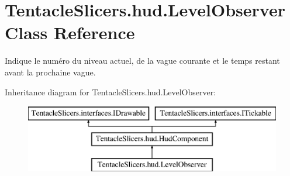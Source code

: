 \hypertarget{class_tentacle_slicers_1_1hud_1_1_level_observer}{}\section{Tentacle\+Slicers.\+hud.\+Level\+Observer Class Reference}
\label{class_tentacle_slicers_1_1hud_1_1_level_observer}


Indique le numéro du niveau actuel, de la vague courante et le temps restant avant la prochaine vague.  


Inheritance diagram for Tentacle\+Slicers.\+hud.\+Level\+Observer\+:\begin{figure}[H]
\begin{center}
\leavevmode
\includegraphics[height=3.000000cm]{class_tentacle_slicers_1_1hud_1_1_level_observer}
\end{center}
\end{figure}

